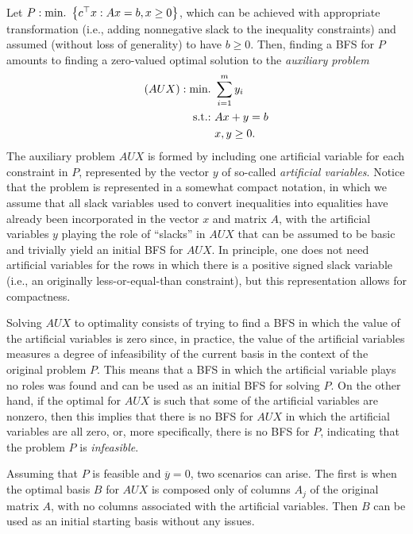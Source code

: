 Let $P : \mathop{\text{min.~}}\left\{ c^\top x : Ax = b, x \geq 0 \right \}$, which can be achieved with appropriate transformation (i.e., adding nonnegative slack to the inequality constraints) and assumed (without loss of generality) to have $b \geq 0$. Then, finding a BFS for $P$ amounts to finding a zero-valued optimal solution to the \emph{auxiliary problem}
%
\begin{align*}
	(AUX) : \mathop{\text{min.~}} &\sum_{i=1}^m y_i \\
	\mathop{\text{s.t.:~}} & Ax + y = b \\
	    & x,y \geq 0.	
\end{align*}
%
The auxiliary problem $AUX$ is formed by including one artificial variable for each constraint in $P$, represented by the vector $y$ of so-called \emph{artificial variables}. Notice that the problem is represented in a somewhat compact notation, in which we assume that all slack variables used to convert inequalities into equalities have already been incorporated in the vector $x$ and matrix $A$, with the artificial variables $y$ playing the role of ``slacks'' in $AUX$ that can be assumed to be basic and trivially yield an initial BFS for $AUX$. In principle, one does not need artificial variables for the rows in which there is a positive signed slack variable (i.e., an originally less-or-equal-than constraint), but this representation allows for compactness. 

Solving $AUX$ to optimality consists of trying to find a BFS in which the value of the artificial variables is zero since, in practice, the value of the artificial variables measures a degree of infeasibility of the current basis in the context of the original problem $P$. This means that a BFS in which the artificial variable plays no roles was found and can be used as an initial BFS for solving $P$. On the other hand, if the optimal for $AUX$ is such that some of the artificial variables are nonzero, then this implies that there is no BFS for $AUX$ in which the artificial variables are all zero, or, more specifically, there is no BFS for $P$, indicating that the problem $P$ is \emph{infeasible}.

Assuming that $P$ is feasible and $\overline{y}=0$, two scenarios can arise. The first is when the optimal basis $B$ for $AUX$ is composed only of columns $A_j$ of the original matrix $A$, with no columns associated with the artificial variables. Then $B$ can be used as an initial starting basis without any issues.


